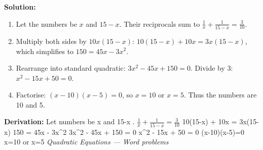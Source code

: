 \documentclass[12pt,a4paper]{exam}
\begin{document}
\begin{questions}
\textbf{Solution:}
\begin{enumerate}
  \item Let the numbers be $x$ and $15-x$. Their reciprocals sum to $\frac{1}{x} + \frac{1}{15-x} = \frac{3}{10}$.
  \item Multiply both sides by $10x(15-x)$: $10(15-x) + 10x = 3x(15-x)$, which simplifies to $150 = 45x - 3x^2$.
  \item Rearrange into standard quadratic: $3x^2 - 45x + 150 = 0$. Divide by 3: $x^2 - 15x + 50 = 0$.
  \item Factorise: $(x-10)(x-5)=0$, so $x=10$ or $x=5$. Thus the numbers are 10 and 5.
\end{enumerate}
\textbf{Derivation:}
Let numbers be  x  and  15-x .
 $\frac{1}{x} + \frac{1}{15-x} = \frac{3}{10}$ 
 10(15-x) + 10x = 3x(15-x) 
 150 = 45x - 3x\textasciicircum{}2 
 3x\textasciicircum{}2 - 45x + 150 = 0 
 x\textasciicircum{}2 - 15x + 50 = 0 
 (x-10)(x-5)=0 
 x=10  or  x=5 
\hfill \textit{Quadratic Equations — Word problems}
\vspace{0.3cm}

\end{questions}
\end{document}
